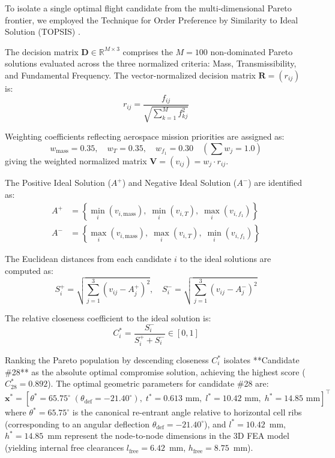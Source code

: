 \documentclass[preprint,12pt,3p]{elsarticle}
\begin{document}
To isolate a single optimal flight candidate from the multi-dimensional Pareto frontier, we employed the Technique for Order Preference by Similarity to Ideal Solution (TOPSIS) \cite{hwang1981}.

The decision matrix $\mathbf{D} \in \mathbb{R}^{M \times 3}$ comprises the $M = 100$ non-dominated Pareto solutions evaluated across the three normalized criteria: Mass, Transmissibility, and Fundamental Frequency. The vector-normalized decision matrix $\mathbf{R} = (r_{ij})$ is:
\begin{equation}
  r_{ij} = \frac{f_{ij}}{\sqrt{\sum_{k=1}^{M} f_{kj}^2}}
  \label{eq:topsis_norm}
\end{equation}

Weighting coefficients reflecting aerospace mission priorities are assigned as:
\begin{equation}
  w_{\text{mass}} = 0.35, \quad w_T = 0.35, \quad w_{f_1} = 0.30 \quad \left(\sum w_j = 1.0\right)
\end{equation}
giving the weighted normalized matrix $\mathbf{V} = (v_{ij}) = w_j \cdot r_{ij}$.

The Positive Ideal Solution ($A^+$) and Negative Ideal Solution ($A^-$) are identified as:
\begin{align}
  A^+ &= \left\{ \min_i(v_{i,\text{mass}}), \; \min_i(v_{i,T}), \; \max_i(v_{i,f_1}) \right\} \\
  A^- &= \left\{ \max_i(v_{i,\text{mass}}), \; \max_i(v_{i,T}), \; \min_i(v_{i,f_1}) \right\}
\end{align}

The Euclidean distances from each candidate $i$ to the ideal solutions are computed as:
\begin{equation}
  S_i^+ = \sqrt{\sum_{j=1}^{3} (v_{ij} - A_j^+)^2}, \quad S_i^- = \sqrt{\sum_{j=1}^{3} (v_{ij} - A_j^-)^2}
\end{equation}

The relative closeness coefficient to the ideal solution is:
\begin{equation}
  C_i^* = \frac{S_i^-}{S_i^+ + S_i^-} \in [0, 1]
  \label{eq:closeness}
\end{equation}

Ranking the Pareto population by descending closeness $C_i^*$ isolates **Candidate \#28** as the absolute optimal compromise solution, achieving the highest score ($C_{28}^* = 0.892$). The optimal geometric parameters for candidate \#28 are:
\begin{equation}
  \mathbf{x}^* = \left[ \theta^* = 65.75^\circ \; (\theta_{\text{def}} = -21.40^\circ), \; t^* = 0.613\text{ mm}, \; l^* = 10.42\text{ mm}, \; h^* = 14.85\text{ mm} \right]^\top
  \label{eq:opt_candidate}
\end{equation}
where $\theta^* = 65.75^\circ$ is the canonical re-entrant angle relative to horizontal cell ribs (corresponding to an angular deflection $\theta_{\text{def}} = -21.40^\circ$), and $l^* = 10.42$~mm, $h^* = 14.85$~mm represent the node-to-node dimensions in the 3D FEA model (yielding internal free clearances $l_{\text{free}} = 6.42$~mm, $h_{\text{free}} = 8.75$~mm).
\end{document}
